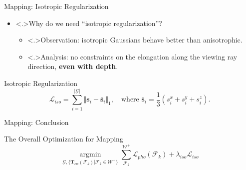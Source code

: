 \begin{Frame}{Mapping: Isotropic Regularization}
	\begin{itemize}
		\setlength{\itemsep}{1.5ex}
		\item<+-> \alert<.>{Why} do we need ``isotropic regularization''?
			\vspace*{1.5ex}
			\begin{itemize}
				\setlength{\itemsep}{1.5ex}
				\item<+-> \alert<.>{Observation:} isotropic Gaussians behave better than anisotrophic.
				\item<+-> \alert<.>{Analysis:} no constraints on the elongation along the viewing ray direction, \textbf{even with depth}.
			\end{itemize}
	\end{itemize}
    \vspace*{\fill}
	\begin{block}{Isotropic Regularization}
		\vspace*{0.5ex}
		\begin{equation}
			\mathcal{L}_{iso} = \sum_{i=1}^{\vert \mathcal{G} \vert} \Vert \mathbf{s}_i - \bar{\mathbf{s}}_i \Vert_1, \quad\text{where } \bar{\mathbf{s}}_i = \frac{1}{3} \left( s_i^{x} + s_i^{y} + s_i^{z} \right).
		\end{equation}
	\end{block}
\end{Frame}

\begin{Frame}{Mapping: Conclusion}
	\begin{block}{The Overall Optimization for Mapping}
		\begin{equation}
			\underset{\mathcal{G}, \{\mathbf{T}_{cw}({\mathcal{F}_k})\vert \mathcal{F}_k\in \mathcal{W}^{+}\}}{\operatorname{argmin}} \sum_{\mathcal{F}_k}^{\mathcal{W}^{+}} \mathcal{L}_{pho}\left({\mathcal{F}_k}\right) + \lambda_{iso} \mathcal{L}_{iso}
		\end{equation}
	\end{block}
\end{Frame}
